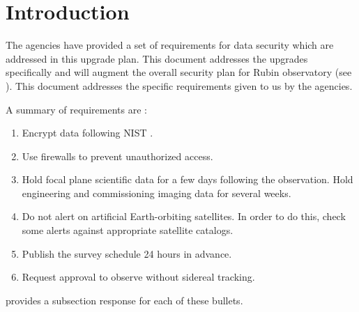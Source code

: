 \section{Introduction}

The agencies have provided a set of requirements for data security which are addressed in this upgrade plan.  This document addresses the upgrades specifically and will augment the overall security plan for Rubin observatory (see ).
This document addresses the specific requirements given to us by the agencies.

A summary of requirements are :
\begin{enumerate}

\item	Encrypt data following \gls{NIST} .
\item	Use firewalls to prevent unauthorized  access.
\item	Hold focal plane scientific data for a few days following the observation. Hold engineering and commissioning imaging data for several weeks.
\item	Do not alert on artificial Earth-orbiting satellites.
In order to do this, check some alerts against appropriate satellite catalogs.
\item	Publish the survey schedule 24 hours in advance.
\item	Request approval to observe without sidereal tracking.

\end{enumerate}


 provides a subsection response for each of these bullets.

